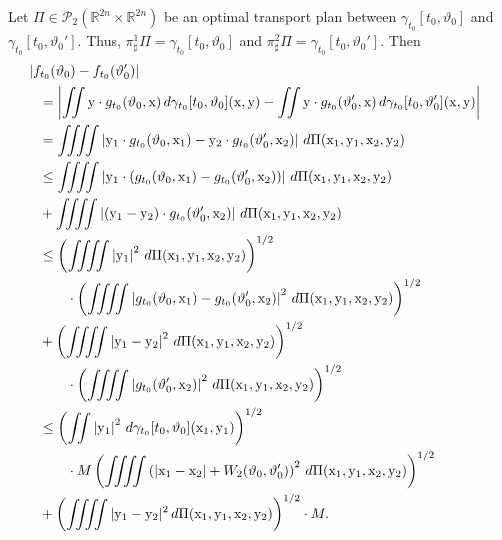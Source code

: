\documentclass[sn-mathphys-num]{sn-jnl}
\numberwithin{equation}{section}
\theoremstyle{mythm}
\theoremstyle{mydef}
\renewcommand{\d}{\,d}
\begin{document}
  Let \( \Pi\in \mathcal{P}_2(\mathbb{R}^{2n} \times \mathbb{R}^{2n}) \) be an optimal transport plan between \( \gamma_{t_0}[t_0,\vartheta_0] \) and \( \gamma_{t_0}[t_0,\vartheta_0'] \). 
    Thus, \( \pi^1_\sharp \Pi = \gamma_{t_0}[t_0,\vartheta_0]  \) and \( \pi^2_\sharp \Pi = \gamma_{t_0}[t_0,\vartheta_0']  \). 
    Then 
    \begin{align*}
      &\hspace{-0.3cm}\left|f_{t_0}(\vartheta_0) - f_{t_0}(\vartheta_0')\right|\\
       &= 
       \left|\iint \mathrm{y}\cdot g_{t_0}(\vartheta_0,\mathrm{x})\d\gamma_{t_0}[t_0,\vartheta_0](\mathrm{x},\mathrm{y}) -\iint \mathrm{y}\cdot g_{t_0}(\vartheta_0',\mathrm{x})\d\gamma_{t_0}[t_0,\vartheta_0'](\mathrm{x},\mathrm{y})\right|\\
       &=
       \iiiint \left|\mathrm{y}_1\cdot g_{t_0}(\vartheta_0,\mathrm{x}_1) - \mathrm{y}_2\cdot g_{t_0}(\vartheta_0',\mathrm{x}_2)\right|\d \Pi(\mathrm{x}_1,\mathrm{y}_1,\mathrm{x}_2,\mathrm{y}_2)  \\
       &\le
       \iiiint \left|\mathrm{y}_1\cdot \left(g_{t_0}(\vartheta_0,\mathrm{x}_1)-  g_{t_0}(\vartheta_0',\mathrm{x}_2)\right)\right|\d \Pi(\mathrm{x}_1,\mathrm{y}_1,\mathrm{x}_2,\mathrm{y}_2)\\
       &+
       \iiiint \left|\left(\mathrm{y}_1- \mathrm{y}_2\right)\cdot g_{t_0}(\vartheta_0',\mathrm{x}_2)\right|\d \Pi(\mathrm{x}_1,\mathrm{y}_1,\mathrm{x}_2,\mathrm{y}_2)\\
       &\le
       \left(\iiiint \left|\mathrm{y}_1\right|^2\d \Pi(\mathrm{x}_1,\mathrm{y}_1,\mathrm{x}_2,\mathrm{y}_2)\right)^{1/2}
     \\&\qquad\cdot \left(\iiiint \left|g_{t_0}(\vartheta_0,\mathrm{x}_1)-  g_{t_0}(\vartheta_0',\mathrm{x}_2)\right|^2\d\Pi(\mathrm{x}_1,\mathrm{y}_1,\mathrm{x}_2,\mathrm{y}_2)\right)^{1/2}\\
       &+
       \left(\iiiint \left|\mathrm{y}_1- \mathrm{y}_2\right|^2\d \Pi(\mathrm{x}_1,\mathrm{y}_1,\mathrm{x}_2,\mathrm{y}_2)\right)^{1/2}\\ 
       &\qquad\cdot
       \left(\iiiint \left|g_{t_0}(\vartheta_0',\mathrm{x}_2)\right|^2\d \Pi(\mathrm{x}_1,\mathrm{y}_1,\mathrm{x}_2,\mathrm{y}_2)\right)^{1/2}\\ 
       &\le
       \left(\iint \left|\mathrm{y}_1\right|^2\d \gamma_{t_0}[t_0,\vartheta_0](\mathrm{x}_1,\mathrm{y}_1)\right)^{1/2}\\ 
       &\qquad\cdot M\left(\iiiint \left(|\mathrm{x}_1-\mathrm{x}_2| + W_2(\vartheta_0,\vartheta_0')\right)^2\d\Pi(\mathrm{x}_1,\mathrm{y}_1,\mathrm{x}_2,\mathrm{y}_2)\right)^{1/2}\\
       &+
       \left(\iiiint |\mathrm{y}_1- \mathrm{y}_2|^2\d \Pi(\mathrm{x}_1,\mathrm{y}_1,\mathrm{x}_2,\mathrm{y}_2)\right)^{1/2}\cdot
M.
    \end{align*}
\end{document}
